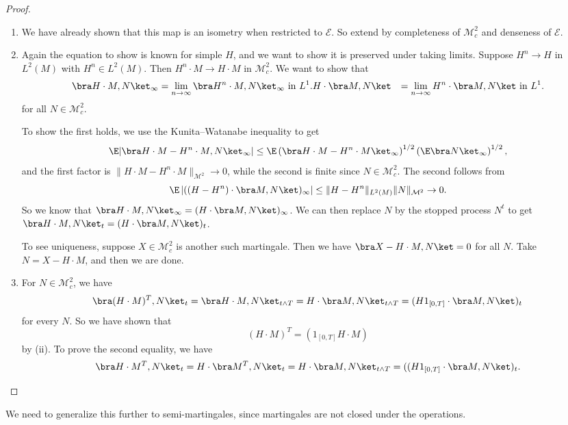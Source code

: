 \documentclass[a4paper]{article}
\begin{document}
\begin{proof}\leavevmode
  \begin{enumerate}
    \item We have already shown that this map is an isometry when restricted to $\mathcal{E}$. So extend by completeness of $\mathcal{M}_c^2$ and denseness of $\mathcal{E}$.
    \item Again the equation to show is known for simple $H$, and we want to show it is preserved under taking limits. Suppose $H^n \to H$ in $L^2(M)$ with $H^n \in L^2(M)$. Then $H^n \cdot M \to H \cdot M$ in $\mathcal{M}_c^2$. We want to show that
      \begin{align*}
        \bra H \cdot M, N\ket_\infty &= \lim_{n \to \infty} \bra H^n \cdot M, N\ket_\infty\text{ in }L^1.
        H \cdot \bra M, N\ket &= \lim_{n \to \infty} H^n \cdot \bra M, N\ket\text{ in }L^1.
      \end{align*}
      for all $N \in \mathcal{M}_c^2$.

      To show the first holds, we use the Kunita--Watanabe inequality to get
      \[
        \E |\bra H \cdot M - H^n \cdot M, N\ket_\infty| \leq \E \left(\bra H \cdot M - H^n \cdot M\ket_\infty\right)^{1/2} \left(\E \bra N\ket_\infty\right)^{1/2},
      \]
      and the first factor is $\|H \cdot M - H^n \cdot M\|_{\mathcal{M}^2} \to 0$, while the second is finite since $N \in \mathcal{M}_c^2$. The second follows from
      \[
        \E \left|((H - H^n) \cdot \bra M, N\ket)_\infty\right| \leq \|H - H^n\|_{L^2(M)} \|N\|_{\mathcal{M}^2} \to 0.
      \]
      So we know that $\bra H \cdot M, N\ket_\infty = (H \cdot \bra M, N\ket)_\infty$. We can then replace $N$ by the stopped process $N^t$ to get $\bra H \cdot M, N\ket_t = (H \cdot \bra M, N\ket)_t$.

      To see uniqueness, suppose $X \in \mathcal{M}_c^2$ is another such martingale. Then we have $\bra X - H \cdot M, N\ket = 0$ for all $N$. Take $N = X - H \cdot M$, and then we are done.
    \item For $N \in \mathcal{M}^2_c$, we have
      \[
        \bra (H \cdot M)^T, N\ket_t = \bra H \cdot M, N \ket_{t \wedge T} = H \cdot \bra M, N\ket_{t \wedge T} = (H 1_{[0, T]} \cdot \bra M, N\ket)_t
      \]
      for every $N$. So we have shown that
      \[
        (H \cdot M)^T = (1_{[0, T]} H \cdot M)
      \]
      by (ii). To prove the second equality, we have
      \[
        \bra H \cdot M^T, N\ket_t = H \cdot \bra M^T, N\ket_t = H \cdot \bra M, N\ket_{t \wedge T} = ((H1_{[0, T]} \cdot \bra M, N\ket)_t.\qedhere
      \]%
  \end{enumerate}
\end{proof}
We need to generalize this further to semi-martingales, since martingales are not closed under the operations.
\end{document}
